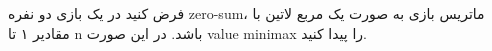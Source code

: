 فرض کنید در یک بازی دو نفره zero-sum، ماتریس بازی به صورت یک مربع لاتین با مقادیر ۱ تا n باشد. در این صورت
value minimax
را پیدا کنید.
